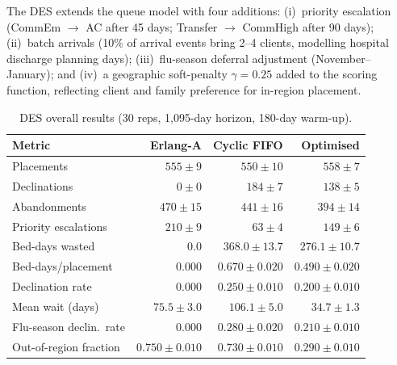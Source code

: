 The DES extends the queue model with four additions: (i)~priority escalation
(CommEm $\to$ AC after 45 days; Transfer $\to$ CommHigh after 90 days);
(ii)~batch arrivals (10\% of arrival events bring 2--4 clients, modelling
hospital discharge planning days); (iii)~flu-season deferral adjustment
(November--January); and (iv)~a geographic soft-penalty $\gamma = 0.25$ added
to the scoring function, reflecting client and family preference for in-region placement.

\begin{table}[H]
\centering
\caption{DES overall results (30 reps, 1{,}095-day horizon, 180-day warm-up).}
\label{tab:des_overall}
\begin{tabular}{lrrr}
\toprule
\textbf{Metric} & \textbf{Erlang-A} & \textbf{Cyclic FIFO} & \textbf{Optimised} \\
\midrule
Placements           & $555 \pm 9$    & $550 \pm 10$    & $558 \pm 7$ \\
Declinations         & $0 \pm 0$      & $184 \pm 7$     & $138 \pm 5$ \\
Abandonments         & $470 \pm 15$   & $441 \pm 16$    & $394 \pm 14$ \\
Priority escalations & $210 \pm 9$    & $63 \pm 4$      & $149 \pm 6$ \\
Bed-days wasted      & $0.0$          & $368.0 \pm 13.7$ & $276.1 \pm 10.7$ \\
Bed-days/placement   & $0.000$        & $0.670 \pm 0.020$ & $0.490 \pm 0.020$ \\
Declination rate     & $0.000$        & $0.250 \pm 0.010$ & $0.200 \pm 0.010$ \\
Mean wait (days)     & $75.5 \pm 3.0$ & $106.1 \pm 5.0$  & $34.7 \pm 1.3$ \\
Flu-season declin.\ rate & $0.000$    & $0.280 \pm 0.020$ & $0.210 \pm 0.010$ \\
Out-of-region fraction & $0.750 \pm 0.010$ & $0.730 \pm 0.010$ & $0.290 \pm 0.010$ \\
\bottomrule
\end{tabular}
\end{table}

